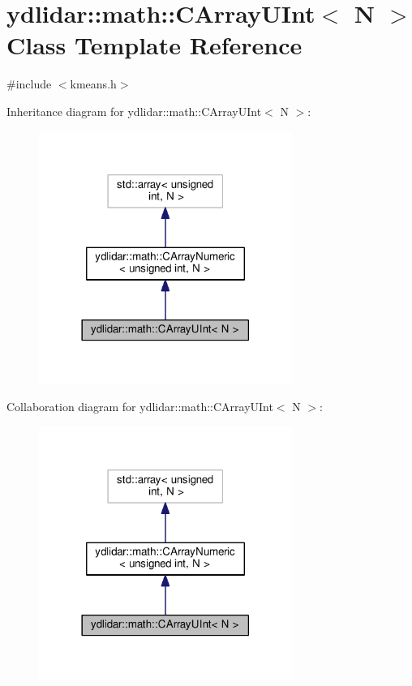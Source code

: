 \hypertarget{classydlidar_1_1math_1_1_c_array_u_int}{}\section{ydlidar\+:\+:math\+:\+:C\+Array\+U\+Int$<$ N $>$ Class Template Reference}
\label{classydlidar_1_1math_1_1_c_array_u_int}


{\ttfamily \#include $<$kmeans.\+h$>$}



Inheritance diagram for ydlidar\+:\+:math\+:\+:C\+Array\+U\+Int$<$ N $>$\+:
\nopagebreak
\begin{figure}[H]
\begin{center}
\leavevmode
\includegraphics[width=234pt]{classydlidar_1_1math_1_1_c_array_u_int__inherit__graph}
\end{center}
\end{figure}


Collaboration diagram for ydlidar\+:\+:math\+:\+:C\+Array\+U\+Int$<$ N $>$\+:
\nopagebreak
\begin{figure}[H]
\begin{center}
\leavevmode
\includegraphics[width=234pt]{classydlidar_1_1math_1_1_c_array_u_int__coll__graph}
\end{center}
\end{figure}
